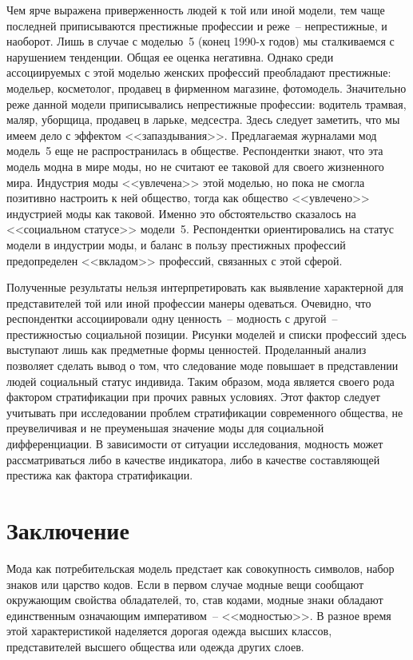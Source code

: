   Чем ярче выражена приверженность людей к той или иной модели, тем чаще
  последней приписываются престижные профессии и реже~-- непрестижные, и
  наоборот. Лишь в случае с моделью~5 (конец 1990-х годов) мы сталкиваемся с
  нарушением тенденции. Общая ее оценка негативна. Однако среди ассоциируемых с
  этой моделью женских профессий преобладают престижные: модельер, косметолог,
  продавец в фирменном магазине, фотомодель. Значительно реже данной модели
  приписывались непрестижные профессии: водитель трамвая, маляр, уборщица,
  продавец в ларьке, медсестра. Здесь следует заметить, что мы имеем дело с
  эффектом <<запаздывания>>. Предлагаемая журналами мод модель~5 еще не
  распространилась в обществе. Респондентки знают, что эта модель модна в мире
  моды, но не считают ее таковой для своего жизненного мира. Индустрия моды
  <<увлечена>> этой моделью, но пока не смогла позитивно настроить к ней
  общество, тогда как общество <<увлечено>> индустрией моды как таковой. Именно
  это обстоятельство сказалось на <<социальном статусе>> модели~5. Респондентки
  ориентировались на статус модели в индустрии моды, и баланс в пользу
  престижных профессий предопределен <<вкладом>> профессий, связанных с этой
  сферой.
  
  Полученные результаты нельзя интерпретировать как выявление характерной для
  представителей той или иной профессии манеры одеваться. Очевидно, что
  респондентки ассоциировали одну ценность~-- модность с другой~-- престижностью
  социальной позиции. Рисунки моделей и списки профессий здесь выступают лишь
  как предметные формы ценностей. Проделанный анализ позволяет сделать вывод о
  том, что следование моде повышает в представлении людей социальный статус
  индивида. Таким образом, мода является своего рода фактором стратификации при
  прочих равных условиях. Этот фактор следует учитывать при исследовании проблем
  стратификации современного общества, не преувеличивая и не преуменьшая
  значение моды для социальной дифференциации. В зависимости от ситуации
  исследования, модность может рассматриваться либо в качестве индикатора, либо
  в качестве составляющей престижа как фактора стратификации.~\cite{bib:2}
  
  \section*{Заключение}

  Мода как потребительская модель предстает как совокупность символов, набор
  знаков или царство кодов. Если в первом случае модные вещи сообщают окружающим
  свойства обладателей, то, став кодами, модные знаки обладают единственным
  означающим императивом~-- <<модностью>>. В разное время этой характеристикой
  наделяется дорогая одежда высших классов, представителей высшего общества или
  одежда других слоев.

